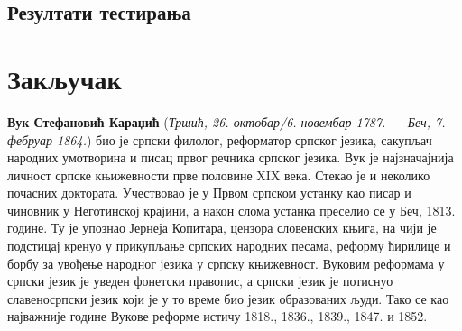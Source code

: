 \documentclass[12pt,oneside]{memoir}
\begin{document}
\section{Резултати тестирања}
\label{sec:rez}


%



\chapter{Закључак}

\literatura

\backmatter

\begin{biografija}
\textbf{Вук Стефановић Караџић} (\emph{Тршић, 26. октобар/6. новембар
  1787. — Беч, 7. фебруар 1864.}) био је српски филолог, реформатор
српског језика, сакупљач народних умотворина и писац првог речника
српског језика.  Вук је најзначајнија личност српске књижевности прве
половине XIX века. Стекао је и неколико почасних доктората.
Учествовао је у Првом српском устанку као писар и чиновник у
Неготинској крајини, а након слома устанка преселио се у Беч,
1813. године. Ту је упознао Јернеја Копитара, цензора словенских
књига, на чији је подстицај кренуо у прикупљање српских народних
песама, реформу ћирилице и борбу за увођење народног језика у српску
књижевност. Вуковим реформама у српски језик је уведен фонетски
правопис, а српски језик је потиснуо славеносрпски језик који је у то
време био језик образованих људи. Тако се као најважније године Вукове
реформе истичу 1818., 1836., 1839., 1847. и 1852.
\end{biografija}
\end{document}
